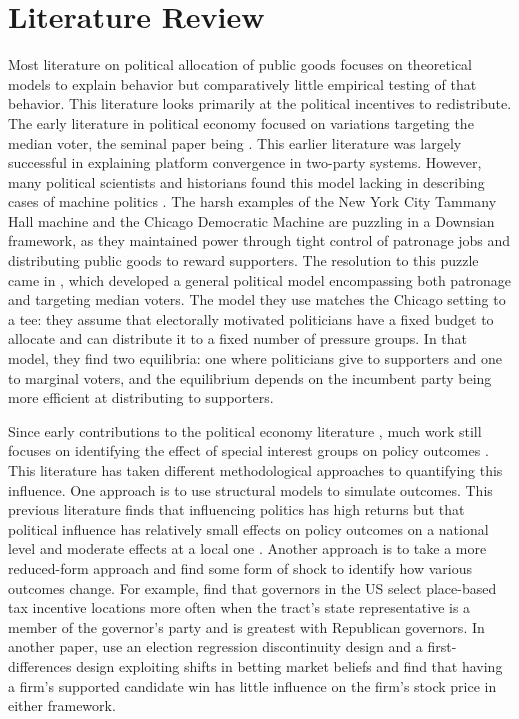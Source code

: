 \section{Literature Review}\label{sec:lit_review}

Most literature on political allocation of public goods focuses on theoretical models to explain behavior but comparatively little empirical testing of that behavior. 
This literature looks primarily at the political incentives to redistribute.
The early literature in political economy focused on variations targeting the median voter, the seminal paper being \cite{downs1957economic}.
This earlier literature was largely successful in explaining platform convergence in two-party systems.
However, many political scientists and historians found this model lacking in describing cases of machine politics \citep{rakove1975don, golway2014machine}.
The harsh examples of the New York City Tammany Hall machine and the Chicago Democratic Machine are puzzling in a Downsian framework, as they maintained power through tight control of patronage jobs and distributing public goods to reward supporters.
The resolution to this puzzle came in \cite{dixit_londregan1996}, which developed a general political model encompassing both patronage and targeting median voters.
The model they use matches the Chicago setting to a tee: they assume that electorally motivated politicians have a fixed budget to allocate and can distribute it to a fixed number of pressure groups.
In that model, they find two equilibria: one where politicians give to supporters and one to marginal voters, and the equilibrium depends on the incumbent party being more efficient at distributing to supporters.


Since early contributions to the political economy literature \citep{grossman_helpman_1996}, much work still focuses on identifying the effect of special interest groups on policy outcomes \citep{bombardini_trebbi2020}. 
This literature has taken different methodological approaches to quantifying this influence.
One approach is to use structural models to simulate outcomes.
This previous literature finds that influencing politics has high returns but that political influence has relatively small effects on policy outcomes on a national level and moderate effects at a local one \citep{kang2015,finan2021electoral}.
Another approach is to take a more reduced-form approach and find some form of shock to identify how various outcomes change.
For example, \cite{frank_hoopes_lester_2022} find that governors in the US select place-based tax incentive locations more often when the tract's state representative is a member of the governor's party and is greatest with Republican governors.
In another paper, \cite{fowleretalquidproquo} use an election regression discontinuity design and a first-differences design exploiting shifts in betting market beliefs and find that having a firm’s supported candidate win has little influence on the firm’s stock price in either framework.


